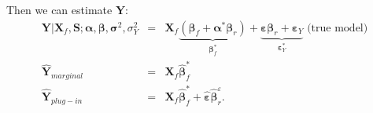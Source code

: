 \documentclass[12pt,a4paper]{report}
\begin{document}
%		
%		
		Then we can estimate $\boldsymbol{Y} $:
\begin{eqnarray}
\boldsymbol{Y}|\boldsymbol{X}_f,\boldsymbol{S};\boldsymbol{\alpha},\boldsymbol{\beta},\boldsymbol{\sigma}^2,\sigma_Y^2 &=& \boldsymbol{X}_f\underbrace{(\boldsymbol{\beta}_f+\boldsymbol{\alpha}^*\boldsymbol{\beta}_r)}_{\boldsymbol{\beta}^*_f}+\underbrace{\boldsymbol{\varepsilon}\boldsymbol{\beta}_r+\boldsymbol{\varepsilon}_Y}_{\boldsymbol{\varepsilon}_Y^*} \textrm{\ \ (true model)} \nonumber\\
	\hat{\boldsymbol{Y}}_{marginal}&=&\boldsymbol{X}_f\hat{\boldsymbol{\beta}}^*_f \nonumber\\
	\hat{\boldsymbol{Y}}_{plug-in}&=&\boldsymbol{X}_f\hat{\boldsymbol{\beta}}^*_f + \hat{\boldsymbol{\varepsilon}}\hat{\boldsymbol{\beta}}_{r}^{\varepsilon}.
\end{eqnarray}
\end{document}
